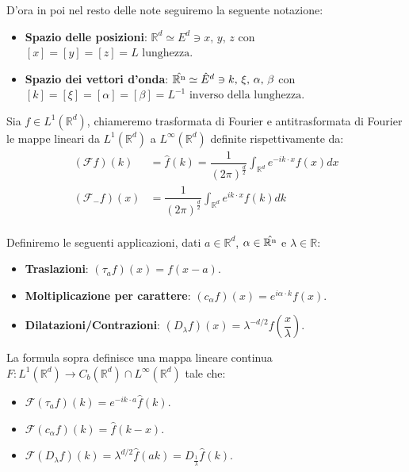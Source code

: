 D'ora in poi nel resto delle note seguiremo la seguente notazione:
\begin{itemize}
    \item \textbf{Spazio delle posizioni}: $\mathbb{R}^d \simeq E^d \ni x,\, y,\,z$ con $[x] = [y] = [z] = L \text{ lunghezza}$.
    \item \textbf{Spazio dei vettori d'onda}: $\operatorname{\hat{\mathbb{R}^n}}\simeq \hat{E}^d \ni k, \, \xi, \, \alpha , \, \beta$ con $[k] = [ \xi ] = [\alpha] = [\beta] = L^{-1} \text{ inverso della lunghezza}$.
\end{itemize}

\begin{definition}
    Sia $f \in L^1(\mathbb{R}^d)$, chiameremo trasformata di Fourier e antitrasformata di Fourier le mappe lineari da $L^1(\mathbb{R}^d) $ a $ L^\infty(\mathbb{R}^d)$ definite rispettivamente da: 
    \begin{align*}
      (\mathcal{F} f)(k) &= \hat{f}(k) = \dfrac{1}{(2 \pi)^\frac{d}{2}}\int_{\mathbb{R}^d} e^{-i k \cdot x} f(x)  dx \\
    (\mathcal{F}_- f)(x) &= \dfrac{1}{(2 \pi)^\frac{d}{2}}\int_{\mathbb{R}^d} e^{i k \cdot x} f(k)  dk \\
    \end{align*}

\end{definition}

Definiremo le seguenti applicazioni, dati $a \in \mathbb{R}^d$,  $\alpha \in \operatorname{\hat{\mathbb{R}^n}}$ e $\lambda \in \mathbb{R}$:
\begin{itemize}
    \item \textbf{Traslazioni}: $(\tau_a f)(x) = f(x - a)$.
    \item \textbf{Moltiplicazione per carattere}: $(c_\alpha f)(x) = e^{i \alpha \cdot k} f(x)$.
    \item \textbf{Dilatazioni/Contrazioni}: $(D_\lambda f)(x) = \lambda^{-d/2} f(\dfrac{x}{\lambda})$.
\end{itemize}

\begin{proposition}
 La formula sopra definisce una mappa lineare continua $F: L^1(\mathbb{R}^d) \to C_b(\mathbb{R}^d) \cap L^\infty(\mathbb{R}^d)$ tale che:
\begin{itemize}
    \item $\mathcal{F}(\tau_a f)(k) = e^{-i k \cdot a} \hat{f}(k)$.
    \item $\mathcal{F}(c_\alpha f)(k) = \hat{f}(k - x)$.
    \item $\mathcal{F}(D_\lambda f)(k) = \lambda^{d/2} \hat{f}(a k)= D_\frac{1}{\lambda} \hat{f}(k)$.
\end{itemize}
\end{proposition}

